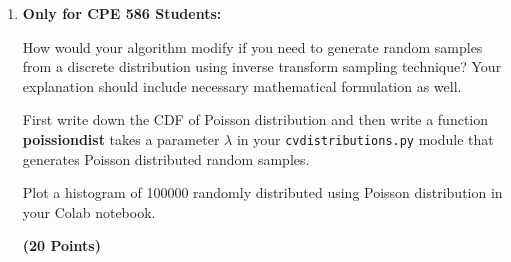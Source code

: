 \documentclass[12pt, xcolor=dvipsnames,svgnames,x11names]{article}
\begin{document}
\begin{enumerate}
Create a function called \textbf{exponentialdist} in your \texttt{cvdistributions.py} module that takes $\lambda$ as an argument and returns a rnadom sample that is exponentially distributed.

Plot a histogram of 100000 randomly distributed using exponential distribution in your Colab notebook.

\textbf{(10 Points)}

\item \textbf{Only for CPE 586 Students:}

How would your algorithm modify if you need to generate random samples from a discrete distribution using inverse transform sampling technique? Your explanation should include necessary mathematical formulation as well.

First write down the CDF of Poisson distribution and then write a function \textbf{poissiondist} takes a parameter $\lambda$ in your \texttt{cvdistributions.py} module that generates 
Poisson distributed random samples.

 Plot a histogram of 100000 randomly distributed using Poisson distribution in your Colab notebook.


\textbf{(20 Points)}

\end{enumerate}
\end{document}
